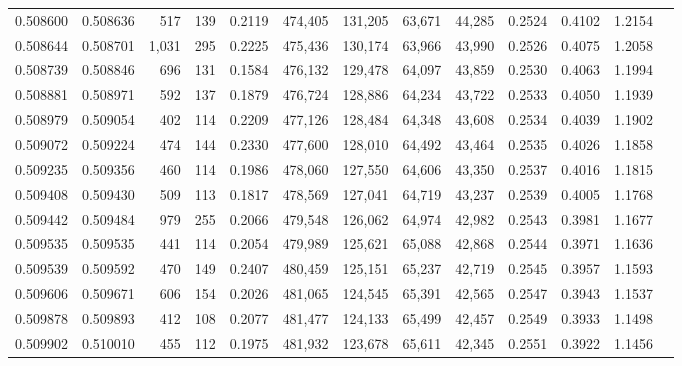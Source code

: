 \begin{tabular}{rrrrrrrrrrrrr}
0.508600 & 0.508636 &   517 &   139 &                                     0.2119 & 474,405 & 131,205 &  63,671 &  44,285 & 0.2524 & 0.4102 & 1.2154 \\
0.508644 & 0.508701 & 1,031 &   295 &                                     0.2225 & 475,436 & 130,174 &  63,966 &  43,990 & 0.2526 & 0.4075 & 1.2058 \\
0.508739 & 0.508846 &   696 &   131 &                                     0.1584 & 476,132 & 129,478 &  64,097 &  43,859 & 0.2530 & 0.4063 & 1.1994 \\
0.508881 & 0.508971 &   592 &   137 &                                     0.1879 & 476,724 & 128,886 &  64,234 &  43,722 & 0.2533 & 0.4050 & 1.1939 \\
0.508979 & 0.509054 &   402 &   114 &                                     0.2209 & 477,126 & 128,484 &  64,348 &  43,608 & 0.2534 & 0.4039 & 1.1902 \\
0.509072 & 0.509224 &   474 &   144 &                                     0.2330 & 477,600 & 128,010 &  64,492 &  43,464 & 0.2535 & 0.4026 & 1.1858 \\
0.509235 & 0.509356 &   460 &   114 &                                     0.1986 & 478,060 & 127,550 &  64,606 &  43,350 & 0.2537 & 0.4016 & 1.1815 \\
0.509408 & 0.509430 &   509 &   113 &                                     0.1817 & 478,569 & 127,041 &  64,719 &  43,237 & 0.2539 & 0.4005 & 1.1768 \\
0.509442 & 0.509484 &   979 &   255 &                                     0.2066 & 479,548 & 126,062 &  64,974 &  42,982 & 0.2543 & 0.3981 & 1.1677 \\
0.509535 & 0.509535 &   441 &   114 &                                     0.2054 & 479,989 & 125,621 &  65,088 &  42,868 & 0.2544 & 0.3971 & 1.1636 \\
0.509539 & 0.509592 &   470 &   149 &                                     0.2407 & 480,459 & 125,151 &  65,237 &  42,719 & 0.2545 & 0.3957 & 1.1593 \\
0.509606 & 0.509671 &   606 &   154 &                                     0.2026 & 481,065 & 124,545 &  65,391 &  42,565 & 0.2547 & 0.3943 & 1.1537 \\
0.509878 & 0.509893 &   412 &   108 &                                     0.2077 & 481,477 & 124,133 &  65,499 &  42,457 & 0.2549 & 0.3933 & 1.1498 \\
0.509902 & 0.510010 &   455 &   112 &                                     0.1975 & 481,932 & 123,678 &  65,611 &  42,345 & 0.2551 & 0.3922 & 1.1456 \\

\end{tabular}
